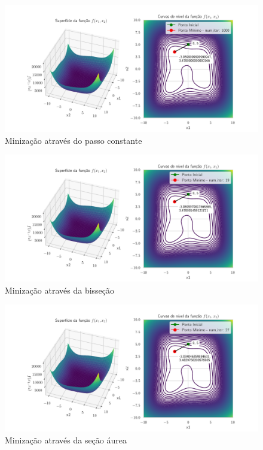 \documentclass[12pt]{article}
\begin{document}
\begin{figure}[H]
    \centering
    \includegraphics[scale = 0.6]{figures/constant_step_2c.pdf}
    \caption{Minização através do passo constante}
\end{figure}

\begin{figure}[H]
    \centering
    \includegraphics[scale = 0.6]{figures/bisection_2c.pdf}
    \caption{Minização através da bisseção}
\end{figure}

\begin{figure}[H]
    \centering
    \includegraphics[scale = 0.6]{figures/golden_section_2c.pdf}
    \caption{Minização através da seção áurea}
\end{figure}
\end{document}
